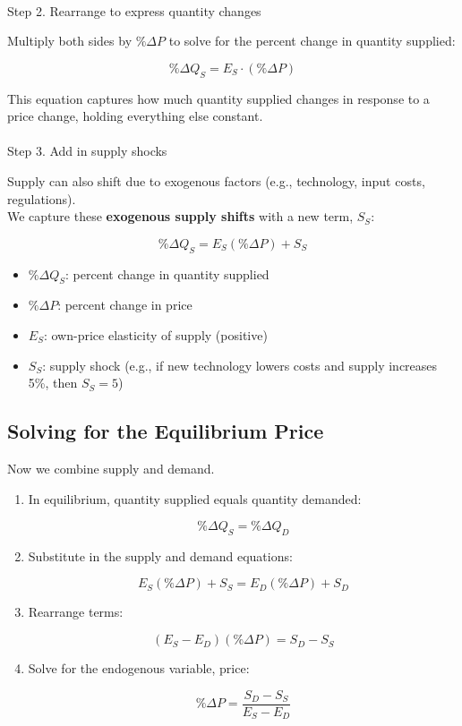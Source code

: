 \documentclass[
  letterpaper,
  DIV=11,
  numbers=noendperiod]{scrartcl}
\makeatletter
\let\oldparagraph\paragraph
\renewcommand{\paragraph}{
    \@ifstar
      \xxxParagraphStar
      \xxxParagraphNoStar
  }
\newcommand{\xxxParagraphStar}[1]{\oldparagraph*{#1}\mbox{}}
\newcommand{\xxxParagraphNoStar}[1]{\oldparagraph{#1}\mbox{}}
\providecommand{\tightlist}{%
  \setlength{\itemsep}{0pt}\setlength{\parskip}{0pt}}
\makeatother
\begin{document}
\paragraph{Step 2. Rearrange to express quantity
changes}\label{step-2.-rearrange-to-express-quantity-changes-1}

Multiply both sides by \(\% \Delta P\) to solve for the percent change
in quantity supplied:

\[
\% \Delta Q_S = E_S \cdot (\% \Delta P)
\]

This equation captures how much quantity supplied changes in response to
a price change, holding everything else constant.

\paragraph{Step 3. Add in supply
shocks}\label{step-3.-add-in-supply-shocks}

Supply can also shift due to exogenous factors (e.g., technology, input
costs, regulations).\\
We capture these \textbf{exogenous supply shifts} with a new term,
\(S_S\):

\[
\% \Delta Q_S = E_S (\% \Delta P) + S_S
\]

\begin{itemize}
\tightlist
\item
  \(\% \Delta Q_S\): percent change in quantity supplied\\
\item
  \(\% \Delta P\): percent change in price\\
\item
  \(E_S\): own-price elasticity of supply (positive)\\
\item
  \(S_S\): supply shock (e.g., if new technology lowers costs and supply
  increases 5\%, then \(S_S = 5\))
\end{itemize}

\subsection{Solving for the Equilibrium
Price}\label{solving-for-the-equilibrium-price}

Now we combine supply and demand.

\begin{enumerate}
\def\labelenumi{\arabic{enumi}.}
\item
  In equilibrium, quantity supplied equals quantity demanded:

  \[
  \% \Delta Q_S = \% \Delta Q_D
  \]
\item
  Substitute in the supply and demand equations:

  \[
  E_S(\% \Delta P) + S_S = E_D(\% \Delta P) + S_D
  \]
\item
  Rearrange terms:

  \[
  (E_S - E_D)(\% \Delta P) = S_D - S_S
  \]
\item
  Solve for the endogenous variable, price:

  \[
  \% \Delta P = \frac{S_D - S_S}{E_S - E_D}
  \]
\end{enumerate}
\end{document}
